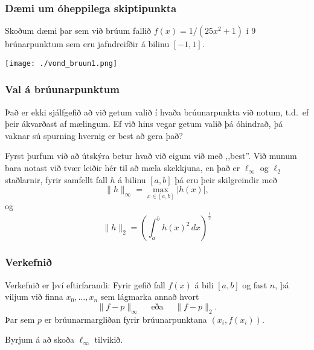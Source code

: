 \documentclass[icelandic,a4paper,12pt]{article}
\begin{document}
\subsubsection{Dæmi um óheppilega skiptipunkta}
Skoðum dæmi þar sem við brúum fallið 
$f(x) = 1/(25x^2+1)$ í 9 brúnarpunktum sem eru jafndreifðir
á bilinu $[-1,1]$.

\begin{center}
 \texttt{[image: ./vond\_bruun1.png]}
\end{center}



\subsubsection{Val á brúunarpunktum}
 Það er ekki sjálfgefið að við getum valið í hvaða brúunarpunkta við notum, t.d.~ef þeir 
 ákvarðast af mælingum. \pause Ef við hins vegar getum valið þá óhindrað, þá vaknar sú spurning 
 hvernig er best að gera það?\pause
 
 Fyrst þurfum við að útskýra betur hvað við eigum við með ,,best''. \pause
 Við munum bara notast við tvær leiðir hér til að mæla skekkjuna, en það er 
 $\ell_\infty$ og $\ell_2$ staðlarnir, \pause fyrir samfellt fall 
 $h$ á bilinu $[a,b]$ þá eru þeir skilgreindir með 
 $$
  \|h\|_\infty  = \max_{x\in[a,b]} |h(x)|,
 $$
 \pause og
 $$
  \|h\|_2 = \left( \int_a^b h(x)^2\, dx \right)^\frac 12
 $$


 
\subsubsection{Verkefnið}
Verkefnið er því eftirfarandi: Fyrir gefið fall $f(x)$ á bili $[a,b]$ og 
fast $n$, þá viljum við finna $x_0,\ldots,x_n$ sem lágmarka annað hvort
$$
  \|f-p\|_\infty \quad \text{ eða } \quad \|f-p\|_2.
$$
Þar sem  $p$ er brúunarmargliðan fyrir brúunarpunktana $(x_i,f(x_i))$.

\pause

Byrjum á að skoða $\ell_\infty$ tilvikið. 
 
\end{document}
